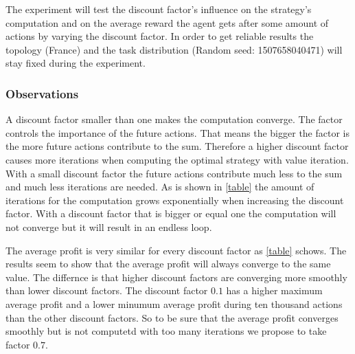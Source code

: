 \documentclass[11pt]{article}
\begin{document}
The experiment will test the discount factor's influence on the strategy's computation and on the average reward the agent gets after some amount of actions by varying the discount factor. In order to get reliable results the topology (France) and the task distribution (Random seed: 1507658040471) will stay fixed during the experiment. 



\subsubsection{Observations}


A discount factor smaller than one makes the computation converge. The factor controls the importance of the future actions. That means the bigger the factor is the more future actions contribute to the sum. Therefore a higher discount factor causes more iterations when computing the optimal strategy with value iteration. With a small discount factor the future actions contribute much less to the sum and much less iterations are needed.  As is shown in \ref{table} the amount of iterations for the computation grows exponentially when increasing the discount factor. With a discount factor that is bigger or equal one the computation will not converge but it will result in an endless loop.


The average profit is very similar for every discount factor as \ref{table} schows. The results seem to show that the average profit will always converge to the same value. The differnce is that higher discount factors are converging more smoothly than lower discount factors. 
The discount factor \(0.1\) has a higher maximum average profit and a lower minumum average profit during ten thousand actions than 
the other discount factors. So to be sure that the average profit converges smoothly but is not computetd with too many iterations we propose to take factor \(0.7\).
\end{document}
